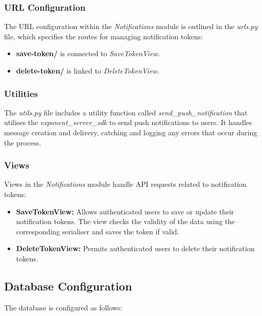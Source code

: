 \subsubsection{URL Configuration}

The URL configuration within the \textit{Notifications} module is outlined in the \textit{urls.py} file, which specifies the routes for managing notification tokens:

\begin{itemize}
    \item \textbf{save-token/} is connected to \textit{SaveTokenView}.
    \item \textbf{delete-token/} is linked to \textit{DeleteTokenView}.
\end{itemize}

\subsubsection{Utilities}

The \textit{utils.py} file includes a utility function called \textit{send\_push\_notification} that utilises the \textit{exponent\_server\_sdk} to send push notifications to users. It handles message creation and delivery, catching and logging any errors that occur during the process.

\subsubsection{Views}

Views in the \textit{Notifications} module handle API requests related to notification tokens:

\begin{itemize}
    \item \textbf{SaveTokenView:} Allows authenticated users to save or update their notification tokens. The view checks the validity of the data using the corresponding serialiser and saves the token if valid.
    \item \textbf{DeleteTokenView:} Permits authenticated users to delete their notification tokens.
\end{itemize}

\subsection{Database Configuration}

The database is configured as follows:

